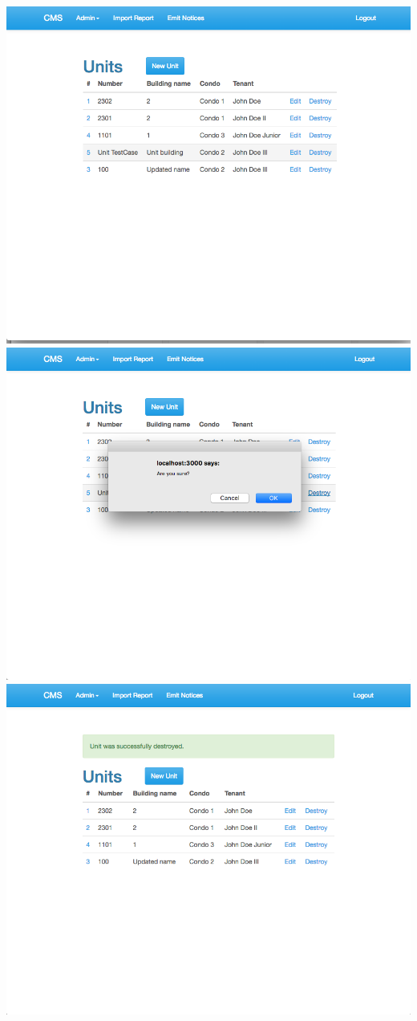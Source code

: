 \begin{itemize}
    \includegraphics[scale=0.25]{./images/ss/unit/delete/2.png}\\
    \includegraphics[scale=0.25]{./images/ss/unit/delete/3.png}
    \includegraphics[scale=0.25]{./images/ss/unit/delete/4.png}
\end{itemize}

